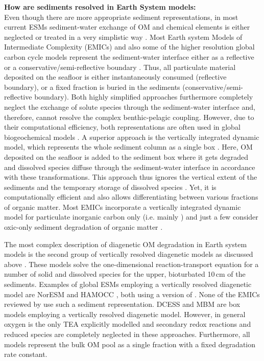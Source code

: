 \documentclass[gmd, manuscript]{copernicus}
\begin{document}
\textbf{How are sediments resolved in Earth System models:}\\
Even though there are more appropriate sediment representations, in most current ESMs sediment-water exchange of OM and chemical elements is either neglected or treated in a very 
simplistic way \citep{soetaert_coupling_2000, huelse_biopump_models_2017}. 
Most Earth system Models of Intermediate Complexity (EMICs) and also some of the higher resolution global carbon cycle models represent the sediment-water interface either as a 
reflective or a conservative/semi-reflective boundary \citep{huelse_biopump_models_2017}. 
Thus, all particulate material deposited on the seafloor is either instantaneously consumed (reflective boundary), or a fixed fraction is buried in the sediments (conservative/semi-reflective boundary). 
Both highly simplified approaches furthermore completely neglect the exchange of solute species through the sediment-water interface and, therefore, cannot resolve the complex benthic-pelagic coupling. 
However, due to their computational efficiency, both representations are often used in global biogeochemical models \citep[e.g.][]{najjar_impact_2007, ridgwell_marine_2007, goosse_description_2010}. 
A superior approach is the vertically integrated dynamic model, which represents the whole sediment column as a single box \citep{huelse_biopump_models_2017}. Here, OM deposited on 
the seafloor is added to the sediment box where it gets degraded and dissolved species diffuse through the sediment-water interface in accordance with these transformations. 
This approach thus ignores the vertical extent of the sediments and the temporary storage of dissolved species \citep{soetaert_coupling_2000}. Yet, it is computationally efficient and 
also allows differentiating between various fractions of organic matter. Most EMICs incorporate a vertically integrated dynamic model for particulate inorganic carbon only 
(i.e. mainly ) and just a few  consider oxic-only sediment degradation of organic matter \citep{huelse_biopump_models_2017}. 

The most complex description of diagenetic OM degradation in Earth system models is the second group of vertically resolved diagenetic models as discussed above 
\citep[e.g.][]{heinze_global_1999, munhoven_glacialinterglacial_2007, shaffer_presentation_2008}. 
These models solve the one-dimensional reaction-transport equation for a number of solid and dissolved species for the upper, bioturbated 10\,cm of the sediments. 
Examples of global ESMs employing a vertically resolved diagenetic model are NorESM \citep{tjiputra_evaluation_2013} and HAMOCC \citep{palastanga_long_term_2011, ilyina_global_2013}, 
both using a version of \citet{heinze_global_1999}. None of the EMICs reviewed by \citet{huelse_biopump_models_2017} use such a sediment representation. 
DCESS \citep{shaffer_presentation_2008} and MBM \citep{munhoven_glacialinterglacial_2007} are box models employing a vertically resolved diagenetic model. 
However, in general oxygen is the only TEA explicitly modelled and secondary redox reactions and reduced species are completely neglected in these approaches. 
Furthermore, all models represent the bulk OM pool as a single fraction with a fixed degradation rate constant. 
\end{document}
